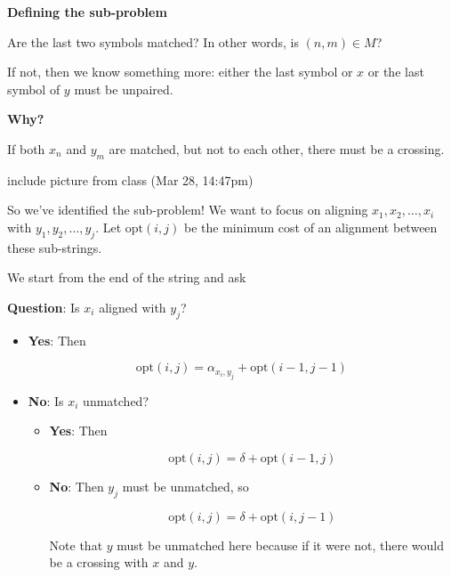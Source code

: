 \documentclass[12pt]{article}
\def\opt{\text{opt}}
\begin{document}
  {\bf Defining the sub-problem}

  Are the last two symbols matched? In other words, is $(n, m) \in M$?


  If not, then we know something more: either the last symbol or $x$ or the last
  symbol of $y$ must be unpaired.

  {\bf Why?}

  If both $x_n$ and $y_m$ are matched, but not to each other, there must be a
  crossing.


  \TODO{} include picture from class (Mar 28, 14:47pm)

  So we've identified the sub-problem! We want to focus on aligning $x_1, x_2,
  \dots, x_i$ with $y_1, y_2, \dots, y_j$. Let $\opt(i, j)$ be the minimum cost
  of an alignment between these sub-strings.

  We start from the end of the string and ask

  {\bf Question}: Is $x_i$ aligned with $y_j$?

  \begin{itemize}
    \item {\bf Yes}: Then

      \[
        \opt(i, j) = \alpha_{x_i, y_j} + \opt(i - 1, j - 1)
      \]

    \item {\bf No}: Is $x_i$ unmatched?
      \begin{itemize}
        \item {\bf Yes}: Then

          \[
            \opt(i, j) = \delta + \opt(i - 1, j)
          \]

        \item {\bf No}: Then $y_j$ must be unmatched, so

          \[
            \opt(i, j) = \delta + \opt(i, j - 1)
          \]

          Note that $y$ must be unmatched here because if it were not, there
          would be a crossing with $x$ and $y$.
      \end{itemize}
  \end{itemize}
\end{document}
